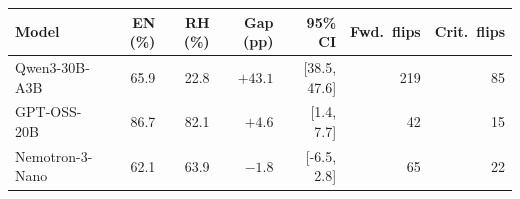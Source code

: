 \begin{tabular}{lrrrrrr}
\toprule
Model & EN (\%) & RH (\%) & Gap (pp) & 95\% CI & Fwd.\ flips & Crit.\ flips \\
\midrule
Qwen3-30B-A3B & 65.9 & 22.8 & $+43.1$ & [38.5, 47.6] & 219 & 85 \\
GPT-OSS-20B & 86.7 & 82.1 & $+4.6$ & [1.4, 7.7] & 42 & 15 \\
Nemotron-3-Nano & 62.1 & 63.9 & $-1.8$ & [-6.5, 2.8] & 65 & 22 \\
\bottomrule
\end{tabular}
